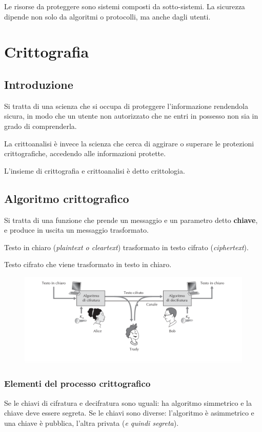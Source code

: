 \documentclass[oneside,a4paper,11pt]{book}
\theoremstyle{italicstyle}
\theoremstyle{normStyle}
\begin{document}
Le risorse da proteggere sono sistemi composti da sotto-sistemi. La sicurezza dipende 
non solo da algoritmi o protocolli, ma anche dagli utenti.
\chapter{Crittografia}
\section{Introduzione}
Si tratta di una scienza che si occupa di proteggere l'informazione rendendola 
sicura, in modo che un utente non autorizzato che ne entri in possesso non sia 
in grado di comprenderla.

La crittoanalisi è invece la scienza che cerca di aggirare o superare le protezioni crittografiche, accedendo alle 
informazioni protette.

L'insieme di crittografia e crittoanalisi è detto crittologia.
\section{Algoritmo crittografico}
Si tratta di una funzione  che prende un messaggio e un parametro detto 
\textbf{chiave}, e produce in uscita un messaggio trasformato.
\begin{tcolorbox}[title = {Cifratura}]
  Testo in chiaro (\textit{plaintext o cleartext}) trasformato in testo cifrato 
  (\textit{ciphertext}).
\end{tcolorbox} 
\begin{tcolorbox}[title = {Decifratura}]
  Testo cifrato che viene trasformato in testo in chiaro.
\end{tcolorbox} 
\begin{figure}[H]
  \centering
  \includegraphics[width=12cm]{src/cifratura.png}
\end{figure}
\subsection{Elementi del processo crittografico}
Se le chiavi di cifratura e decifratura sono uguali: ha algoritmo simmetrico e la chiave 
deve essere segreta.
Se le chiavi sono diverse: l'algoritmo è asimmetrico e una chiave è pubblica, l'altra privata 
(\textit{e quindi segreta}).
\end{document}
